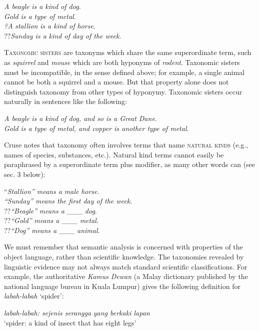 \ea \label{ex:6.18}
\ea \textit{A beagle} \textit{is a kind of dog}.\\
\ex \textit{Gold} \textit{is a type of metal}.\\
\ex \textit{?A} \textit{stallion} \textit{is a kind of horse.}\\
\ex ??\textit{Sunday is a} \textit{kind of day of the week}.
                       \z
\z


\textsc{Taxonomic sisters} are taxonyms which share the same superordinate term, such as \textit{squirrel} and \textit{mouse} which are both hyponyms of \textit{rodent}. Taxonomic sisters must be incompatible, in the sense defined above; for example, a single animal cannot be both a squirrel and a mouse. But that property alone does not distinguish taxonomy from other types of hyponymy. Taxonomic sisters occur naturally in sentences like the following:

\ea \label{ex:6.19} \ea \textit{A beagle} \textit{is a kind of dog, and so is a Great Dane}.\\
\ex \textit{Gold} \textit{is a type of metal, and copper is another type of metal}.
\z \z


Cruse notes that taxonomy often involves terms that name \textsc{natural kinds} (e.g., names of species, substances, etc.). Natural kind terms cannot easily be paraphrased by a superordinate term plus modifier, as many other words can (see sec. 3 below):


\ea 
\label{ex:6.20}
\ea “\textit{Stallion” means a male} \textit{horse.}\\
\ex \textit{“Sunday” mean}\textit{s the first day of the week}.\\
\ex ??\textit{“Beagle”} \textit{means a \_\_\_} \textit{dog}.\\
\ex ??\textit{“Gold”} \textit{means a \_\_\_ metal}.\\
\ex ??\textit{“Dog”} \textit{means a \_\_\_} \textit{animal}.
\z \z


We must remember that semantic analysis is concerned with properties of the object language, rather than scientific knowledge. The taxonomies revealed by linguistic evidence may not always match standard scientific classifications. For example, the authoritative \textit{Kamus Dewan} (a Malay dictionary published by the national language bureau in Kuala Lumpur) gives the following definition for \textit{labah-labah} ‘spider’:


\ea \label{ex:6.21
}\textit{labah-labah: sejenis serangga} \textit{yang berkaki lapan}\\
‘spider: a kind of insect that has eight legs’
\z


